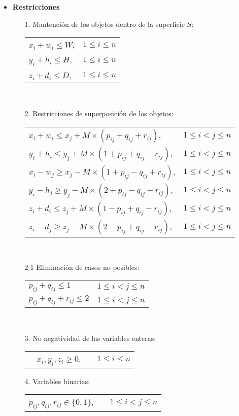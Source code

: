 \begin{itemize}
\pagebreak
\item {\bf Restricciones}
\begin{itemize}
\item[1.] Mantención de los objetos dentro de la superficie $S$: \\[6pt]
\begin{tabular}{p{9.5cm} l}
$x_i + w_i \le W$, & $1 \le i \le n$ \\
$y_i + h_i \le H$, & $1 \le i \le n$ \\
$z_i + d_i \le D$, & $1 \le i \le n$ \\
\end{tabular} \\
\item[2.] Restricciones de superposición de los objetos: \\[6pt]
\begin{tabular}{p{9.5cm} l}
$x_i + w_i \le x_j + M \times (p_{ij} + q_{ij} + r_{ij})$, & $1 \le i < j \le n$ \\
$y_i + h_i \le y_j + M \times (1 + p_{ij} + q_{ij} - r_{ij})$, & $1 \le i < j \le n$ \\
$x_i - w_j \ge x_j - M \times (1 + p_{ij} - q_{ij} + r_{ij})$, & $1 \le i < j \le n$ \\
$y_i - h_j \ge y_j - M \times (2 + p_{ij} - q_{ij} - r_{ij})$, & $1 \le i < j \le n$ \\
$z_i + d_i \le z_j + M \times (1 - p_{ij} + q_{ij} + r_{ij})$, & $1 \le i < j \le n$ \\
$z_i - d_j \ge z_j - M \times (2 - p_{ij} + q_{ij} - r_{ij})$, & $1 \le i < j \le n$ \\
\end{tabular} \\
\item[2.1] Eliminación de casos no posibles: \\[6pt]
\begin{tabular}{p{9.5cm} l}
$p_{ij} + q_{ij} \le 1$ & $1 \le i < j \le n$ \\
$p_{ij} + q_{ij} + r_{ij} \le 2$ & $1 \le i < j \le n$ \\
\end{tabular} \\
\item[3.] No negatividad de las variables enteras: \\[6pt]
\begin{tabular}{p{0.6cm} r p{0.5cm} l}
& $x_i, y_i, z_i \ge 0$, & & $1 \le i \le n$ \\
\end{tabular} \vspace{5pt}
\item[4.] Variables binarias: \\[6pt]
\begin{tabular}{r p{0.5cm} l}
$p_{ij}, q_{ij}, r_{ij} \in \{0,1\}$, & & $1 \le i < j \le n$ \\
\end{tabular} \\
\end{itemize}
\end{itemize}

